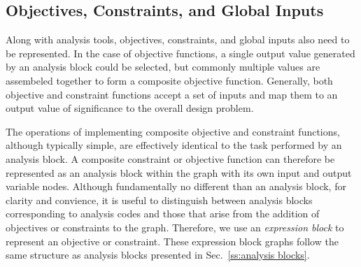 % 

\subsection{Objectives, Constraints, and Global Inputs}
\label{ss:objectives and constraints}
Along with analysis tools, objectives, constraints, and global inputs also need to be represented.
In the case of objective functions, a single output value generated by an analysis block could be selected, but commonly multiple values are assembeled together to form a composite objective function. 
Generally, both objective and constraint functions accept a set of inputs and map them to an output value of significance to the overall design problem. 

The operations of implementing composite objective and constraint functions, although typically simple, are effectively identical to the task performed by an analysis block. 
A composite constraint or objective function can therefore be represented as an analysis block within the graph with its own input and output variable nodes. 
Although fundamentally no different than an analysis block, for clarity and convience, it is useful to distinguish between analysis blocks corresponding to analysis codes and those that arise from the addition of objectives or constraints to the graph. 
Therefore, we use an \emph{expression block} to represent an objective or constraint. 
These expression block graphs follow the same structure as analysis blocks presented in Sec.~\ref{ss:analysis blocks}.

